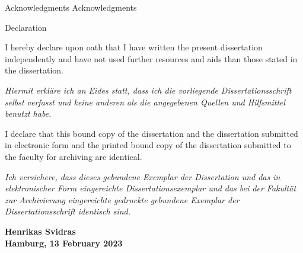 \begin{abstractpage}{Acknowledgments}
    Acknowledgments
    
    \end{abstractpage}
    \begin{abstractpage}{Declaration}

    I hereby declare upon oath that I have written the present dissertation independently and have not used further resources and aids than those stated in the dissertation.
    
    \textit{Hiermit erkläre ich an Eides statt, dass ich die vorliegende Dissertationsschrift selbst verfasst und keine anderen als die angegebenen Quellen und Hilfsmittel benutzt habe.}

    I declare that this bound copy of the dissertation and the dissertation submitted in electronic form and the printed bound copy of the dissertation submitted to the faculty for archiving are identical.

    \textit{Ich versichere, dass dieses gebundene Exemplar der Dissertation und das in elektronischer Form eingereichte Dissertationsexemplar und das bei der Fakultät zur Archivierung eingereichte gedruckte gebundene Exemplar der Dissertationsschrift identisch sind.}

    \par\bigskip
    \par\bigskip
    
    \begin{flushright}
    \par\bigskip
    \textbf{Henrikas Svidras}\\
    \textbf{Hamburg, 13 February 2023}
    \end{flushright}
    \end{abstractpage}
